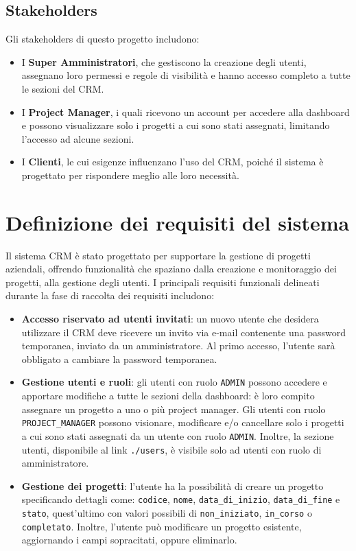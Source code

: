 \documentclass[target=bach,aauheader=,style=]{thud}
\begin{document}
\subsection{Stakeholders}
Gli stakeholders di questo progetto includono:

\begin{itemize}
    \item I \textbf{Super Amministratori}, che gestiscono la creazione degli utenti, assegnano loro permessi e regole di visibilità e hanno accesso completo a tutte le sezioni del CRM. 
    \item I \textbf{Project Manager}, i quali ricevono un account per accedere alla dashboard e possono visualizzare solo i progetti a cui sono stati assegnati, limitando l'accesso ad alcune sezioni.
    \item I \textbf{Clienti}, le cui esigenze influenzano l'uso del CRM, poiché il sistema è progettato per rispondere meglio alle loro necessità.
\end{itemize}

\section{Definizione dei requisiti del sistema}
Il sistema CRM è stato progettato per supportare la gestione di progetti aziendali, offrendo funzionalità che spaziano dalla creazione e monitoraggio dei progetti, alla gestione degli utenti. I principali requisiti funzionali delineati durante la fase di raccolta dei requisiti includono:

\begin{itemize}
    \item \textbf{Accesso riservato ad utenti invitati}: un nuovo utente che desidera utilizzare il CRM deve ricevere un invito via e-mail contenente una password temporanea, inviato da un amministratore. Al primo accesso, l'utente sarà obbligato a cambiare la password temporanea.
    \item \textbf{Gestione utenti e ruoli}: gli utenti con ruolo \texttt{ADMIN} possono accedere e apportare modifiche a tutte le sezioni della dashboard: è loro compito assegnare un progetto a uno o più project manager. Gli utenti con ruolo \texttt{PROJECT\_MANAGER} possono visionare, modificare e/o cancellare solo i progetti a cui sono stati assegnati da un utente con ruolo \texttt{ADMIN}. Inoltre, la sezione utenti, disponibile al link \texttt{./users}, è visibile solo ad utenti con ruolo di amministratore.
    \item \textbf{Gestione dei progetti}: l'utente ha la possibilità di creare un progetto specificando dettagli come: \texttt{codice}, \texttt{nome}, \texttt{data\_di\_inizio}, \texttt{data\_di\_fine} e \texttt{stato}, quest'ultimo con valori possibili di \texttt{non\_iniziato}, \texttt{in\_corso} o \texttt{completato}. Inoltre, l'utente può modificare un progetto esistente, aggiornando i campi sopracitati, oppure eliminarlo.
\end{itemize}
\end{document}
